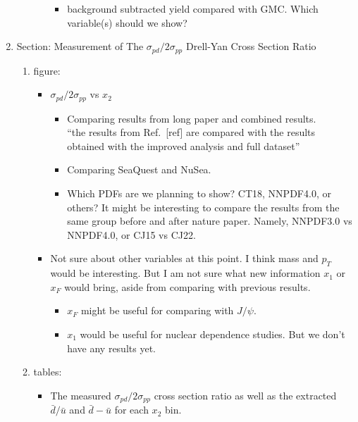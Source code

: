 \documentclass{article}
\begin{document}
\begin{enumerate}
\begin{enumerate}
\begin{itemize}
\begin{itemize}
                \item background subtracted yield compared with GMC. Which variable(s) should we show?
            \end{itemize}
        \end{itemize}
    \end{enumerate}
    \item Section: Measurement of The \texorpdfstring{$\sigma_{pd}/2\sigma_{pp}$}{pd/2pp} Drell-Yan Cross Section Ratio
    \begin{enumerate}
        \item figure:
        \begin{itemize}
            \item $\sigma_{pd}/2\sigma_{pp}$ vs $x_2$
            \begin{itemize}
                \item Comparing results from long paper and combined results.\\
                ``the results from Ref.~[ref]  are compared with the results obtained with the improved analysis and full dataset''
                \item Comparing SeaQuest and NuSea.
                \item Which PDFs are we planning to show? CT18, NNPDF4.0, or others?
                    It might be interesting to compare the results from the same group before and after nature paper.
                    Namely, NNPDF3.0 vs NNPDF4.0, or CJ15 vs CJ22. 
            \end{itemize}
            \item Not sure about other variables at this point. I think mass and $p_T$ would be interesting.
            But I am not sure what new information $x_1$ or $x_F$ would bring, aside from comparing with previous results. 
            \begin{itemize}
                \item $x_F$ might be useful for comparing with $J/\psi$.
                \item $x_1$ would be useful for nuclear dependence studies. But we don't have any results yet.
            \end{itemize}
        \end{itemize}
        \item tables:
        \begin{itemize}
            \item The measured $\sigma_{pd}/2\sigma_{pp}$ cross section ratio as well
		as the extracted $\bar{d}/\bar{u}$ and $\bar{d}-\bar{u}$ for each $x_{2}$ bin.

\end{itemize}
\end{enumerate}
\end{enumerate}
\end{document}
